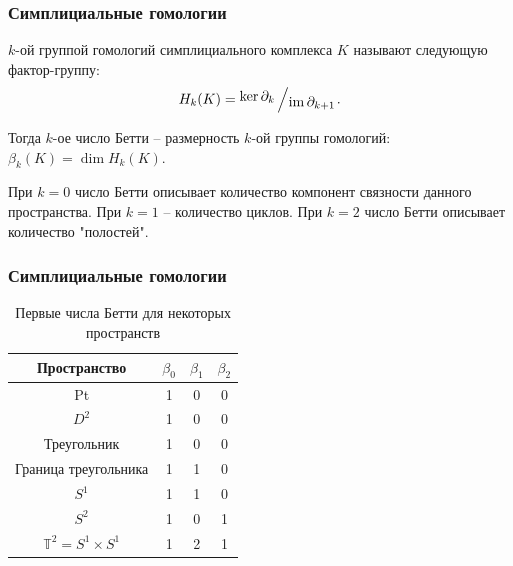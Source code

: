 \documentclass{beamer}
\DeclareMathOperator{\im}{im}
\newcommand{\quotient}[2]{{\raisebox{.2em}{$#1$}\left/\raisebox{-.2em}{$#2$}\right.}}
\begin{document}
		\begin{frame}
			\frametitle{Симплициальные гомологии}
			\begin{definition}
				$k$-ой группой гомологий симплициального комплекса $K$ называют следующую фактор-группу:
				\[
				H_k(K) = \quotient{\ker \partial_k}{\im \partial_{k+1}}.
				\]
				
				Тогда $k$-ое число Бетти -- размерность $k$-ой группы гомологий: $\beta_k(K) = \dim H_k(K)$. 
			\end{definition}
			При $k=0$ число Бетти описывает количество компонент связности данного пространства. При $k=1$ -- количество циклов. При $k=2$ число Бетти описывает количество "полостей".
		\end{frame}
		\begin{frame}
			\frametitle{Симплициальные гомологии}
			\begin{center}
				\begin{table}[!htbp]
					\centering
					\begin{tabular}{ |c|c c c| }
						\hline
						Пространство & $\beta_0$ & $\beta_1$ & $\beta_2$ \\ 
						\hline
						Pt & 1 & 0 & 0 \\ 
						$D^2$ & 1 & 0 & 0 \\ 
						Треугольник & 1 & 0 & 0 \\
						Граница треугольника & 1 & 1 & 0 \\
						$S^1$ & 1 & 1 & 0 \\
						$S^2$ & 1 & 0 & 1 \\
						$\mathbb{T}^2 = S^1 \times S^1$ & 1 & 2 & 1 \\
						\hline
					\end{tabular}
					\caption{Первые числа Бетти для некоторых пространств}
				\end{table}
			\end{center}
		\end{frame}
\end{document}

